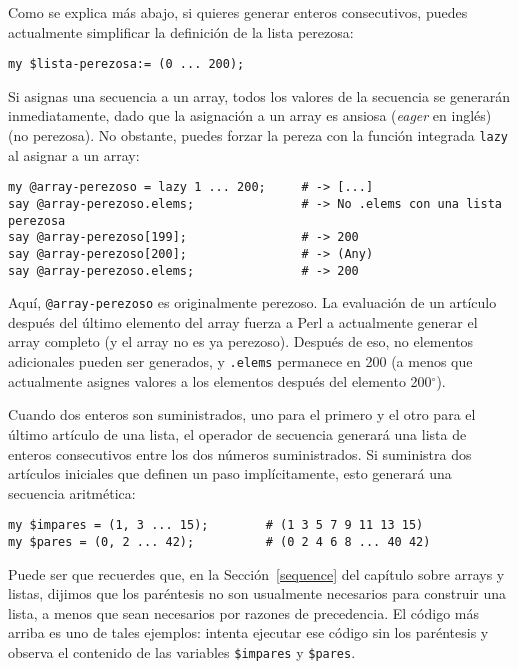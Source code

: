 Como se explica más abajo, si quieres generar enteros consecutivos,
puedes actualmente simplificar la definición de la lista perezosa:

\begin{verbatim}
my $lista-perezosa:= (0 ... 200);
\end{verbatim}


Si asignas una secuencia a un array, todos los valores de la
secuencia se generarán inmediatamente, dado que la asignación
a un array es ansiosa (\emph{eager} en inglés) (no perezosa). 
No obstante, puedes forzar la pereza con la función integrada 
{\tt lazy} al asignar a un array:

\begin{verbatim}
my @array-perezoso = lazy 1 ... 200;     # -> [...]
say @array-perezoso.elems;               # -> No .elems con una lista perezosa
say @array-perezoso[199];                # -> 200
say @array-perezoso[200];                # -> (Any)
say @array-perezoso.elems;               # -> 200
\end{verbatim}

Aquí, \verb|@array-perezoso| es originalmente perezoso.  La evaluación 
de un artículo después del último elemento del array fuerza a Perl
a actualmente generar el array completo (y el array no es ya perezoso).
Después de eso, no elementos adicionales pueden ser generados, y {\tt .elems}
permanece en 200 (a menos que actualmente asignes valores a los elementos
después del elemento 200$^\circ$).

Cuando dos enteros son suministrados, uno para el primero y el otro para
el último artículo de una lista, el operador de secuencia  generará una
lista de enteros consecutivos entre los dos números suministrados. 
Si suministra dos artículos iniciales que definen un paso implícitamente,
esto generará una secuencia aritmética:

\begin{verbatim}
my $impares = (1, 3 ... 15);        # (1 3 5 7 9 11 13 15)
my $pares = (0, 2 ... 42);          # (0 2 4 6 8 ... 40 42)
\end{verbatim}

Puede ser que recuerdes que, en la Sección~\ref{sequence} 
del capítulo sobre arrays y listas, dijimos que los paréntesis 
no son usualmente necesarios para construir una lista, a menos 
que sean necesarios por razones de precedencia. El código más
arriba es uno de tales ejemplos: intenta ejecutar ese código
sin los paréntesis y observa el contenido de las variables \verb|$impares|
y \verb|$pares|.

